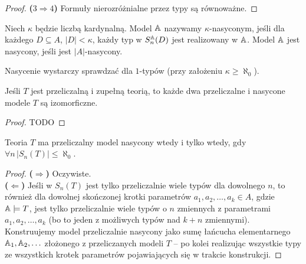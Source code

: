 \documentclass{article}
\begin{document}
\begin{proof}
	\textbf{($3 \Rightarrow 4$)}
	Formuły nierozróżnialne przez typy są równoważne.
\end{proof}


\begin{df}
	 Niech $\kappa$ będzie liczbą kardynalną.
	 Model $\mathbb{A}$ nazywamy $\kappa$-nasyconym, jeśli dla każdego $D \subseteq A$, $|D| < \kappa$, każdy typ w $S^{\mathbb{A}}_n(D)$ jest realizowany w $\mathbb{A}$.
	Model $\mathbb{A}$ jest nasycony, jeśli jest $|A|$-nasycony.
\end{df}

\begin{uw}
	Nasycenie wystarczy sprawdzać dla $1$-typów (przy założeniu $\kappa \geq \aleph_0$).
\end{uw}

\begin{stw}
	 Jeśli $T$ jest przeliczalną i zupełną teorią, to każde dwa przeliczalne i nasycone modele $T$ są izomorficzne.
\end{stw}
\begin{proof}
	 TODO
\end{proof}
\begin{stw}
	Teoria $T$ ma przeliczalny model nasycony wtedy i tylko wtedy, gdy $\forall n \,|S_n(T)| \leq \aleph_0$.
\end{stw}
\begin{proof}
	 \textbf{($\Rightarrow$)} Oczywiste.
	 \\\textbf{($\Leftarrow$)} Jeśli w $S_n(T)$ jest tylko przeliczalnie wiele typów dla dowolnego $n$, to również dla dowolnej skończonej krotki parametrów $a_1, a_2, \ldots, a_k \in A$, gdzie $\mathbb{A} \models T$, jest tylko przeliczalnie wiele typów o $n$ zmiennych z parametrami $a_1, a_2, \ldots, a_k$ (bo to jeden z możliwych typów nad $k+n$ zmiennymi).
	 Konstruujemy model przeliczalnie nasycony jako sumę łańcucha elementarnego $\mathbb{A}_1, \mathbb{A}_2, \ldots$ złożonego z przeliczanych modeli $T$ -- po kolei realizując wszystkie typy ze wszystkich krotek parametrów pojawiających się w trakcie konstrukcji.

\end{proof}
\end{document}

